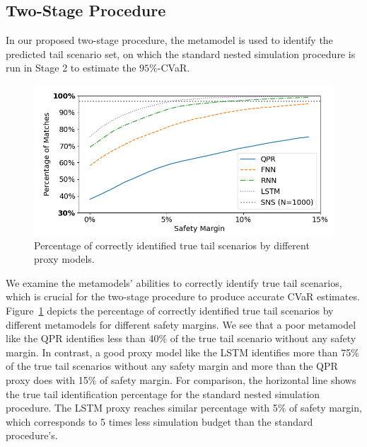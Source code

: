 \documentclass{article}
\begin{document}
\subsection{Two-Stage Procedure}

In our proposed two-stage procedure, the metamodel is used to identify the predicted tail scenario set, on which the standard nested simulation procedure is run in Stage 2 to estimate the $95\%$-CVaR.

\begin{figure}[ht]
    \centering
    \includegraphics[width=0.48\linewidth]{./figures/tailCutoff.png}
    \caption{Percentage of correctly identified true tail scenarios by different proxy models.}
    \label{fig:tailcutoff}
\end{figure}

We examine the metamodels' abilities to correctly identify true tail scenarios, which is crucial for the two-stage procedure to produce accurate CVaR estimates.
Figure~\ref{fig:tailcutoff} depicts the percentage of correctly identified true tail scenarios by different metamodels for different safety margins.
We see that a poor metamodel like the QPR identifies less than 40\% of the true tail scenario without any safety margin.
In contrast, a good proxy model like the LSTM identifies more than 75\% of the true tail scenarios without any safety margin and more than the QPR proxy does with 15\% of safety margin.
For comparison, the horizontal line shows the true tail identification percentage for the standard nested simulation procedure.
The LSTM proxy reaches similar percentage with 5\% of safety margin, which corresponds to 5 times less simulation budget than the standard procedure's.
\end{document}
